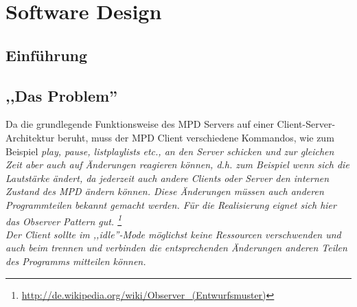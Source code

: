 
\chapter{Software Design}

\section{Einführung}

\section{,,Das Problem''}

Da die grundlegende Funktionsweise des MPD Servers auf einer Client-Server-Architektur beruht, muss der MPD Client
verschiedene Kommandos, wie zum Beispiel \it play, pause, listplaylists \rm etc., an den Server schicken
und zur gleichen Zeit aber auch auf Änderungen reagieren können, d.h. zum Beispiel wenn sich die Lautstärke ändert,
da jederzeit auch andere Clients oder Server den internen Zustand des MPD ändern können.
Diese Änderungen müssen auch anderen Programmteilen bekannt gemacht werden.
Für die Realisierung eignet sich hier das Observer Pattern gut. \footnote{\url{http://de.wikipedia.org/wiki/Observer\_(Entwurfsmuster)}}
\\
Der Client sollte im ,,idle''-Mode möglichst keine Ressourcen verschwenden und auch beim 
trennen und verbinden die entsprechenden Änderungen anderen Teilen des Programms mitteilen
können. 
\\

